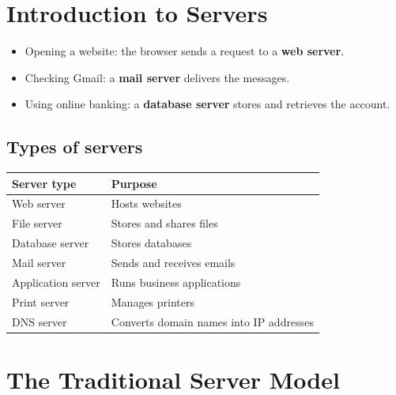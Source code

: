 \documentclass[11pt,a4paper]{article}
\begin{document}
\notebookcover


\section{Introduction to Servers}



\begin{itemize}\itemsep2pt
  \item Opening a website: the browser sends a request to a \textbf{web server}.
  \item Checking Gmail: a \textbf{mail server} delivers the messages.
  \item Using online banking: a \textbf{database server} stores and retrieves the account.
\end{itemize}


\subsection{Types of servers}

\begin{tabularx}{\textwidth}{@{}lX@{}}
\toprule
\rowcolor{tablehead} \textbf{Server type} & \textbf{Purpose} \\
\midrule
Web server & Hosts websites \\
File server & Stores and shares files \\
Database server & Stores databases \\
Mail server & Sends and receives emails \\
Application server & Runs business applications \\
Print server & Manages printers \\
DNS server & Converts domain names into IP addresses \\
\bottomrule
\end{tabularx}

\section{The Traditional Server Model}
\end{document}
